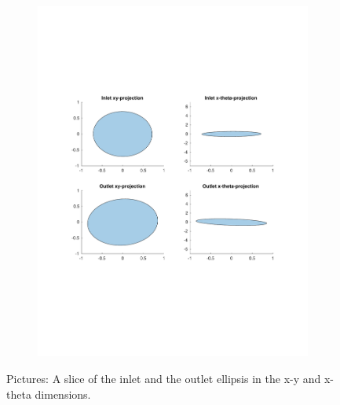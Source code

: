 \begin{figure}
\begin{subfigure}[b]{0.4\textwidth}
    \includegraphics[width=\textwidth]{figures/experiments/sos-calculation-inlet-outlet}
  \end{subfigure}
  \caption{Pictures: A slice of the inlet and the outlet ellipsis in the x-y and
    x-theta dimensions.}
  \label{fig:funnel-conv}
\end{figure}

